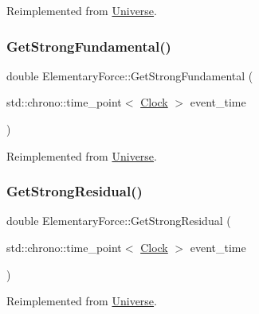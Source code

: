 Reimplemented from \mbox{\hyperlink{classUniverse_acb453ce71da418c5b5617fecede9571b}{Universe}}.

\mbox{\label{classElementaryForce_a0974d6537c07dac2453d2a607324fa21}} 
\subsubsection{\texorpdfstring{Get\+Strong\+Fundamental()}{GetStrongFundamental()}}
{\footnotesize\ttfamily double Elementary\+Force\+::\+Get\+Strong\+Fundamental (\begin{DoxyParamCaption}\item[{std\+::chrono\+::time\+\_\+point$<$ \mbox{\hyperlink{universe_8h_a0ef8d951d1ca5ab3cfaf7ab4c7a6fd80}{Clock}} $>$}]{event\+\_\+time }\end{DoxyParamCaption})\hspace{0.3cm}{\ttfamily [virtual]}}



Reimplemented from \mbox{\hyperlink{classUniverse_ab44daccba01ee7e3cf9b50bba83dd19e}{Universe}}.

\mbox{\label{classElementaryForce_a3478c8ad35bce240055da7d4a03e555e}} 
\subsubsection{\texorpdfstring{Get\+Strong\+Residual()}{GetStrongResidual()}}
{\footnotesize\ttfamily double Elementary\+Force\+::\+Get\+Strong\+Residual (\begin{DoxyParamCaption}\item[{std\+::chrono\+::time\+\_\+point$<$ \mbox{\hyperlink{universe_8h_a0ef8d951d1ca5ab3cfaf7ab4c7a6fd80}{Clock}} $>$}]{event\+\_\+time }\end{DoxyParamCaption})\hspace{0.3cm}{\ttfamily [virtual]}}



Reimplemented from \mbox{\hyperlink{classUniverse_af0f4b81950061e63c2855eb40957a5b1}{Universe}}.

